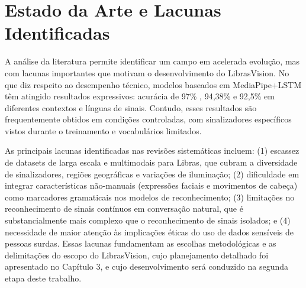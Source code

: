 \section{Estado da Arte e Lacunas Identificadas}

A análise da literatura permite identificar um campo em acelerada evolução, mas com lacunas importantes que motivam o desenvolvimento do LibrasVision. No que diz respeito ao desempenho técnico, modelos baseados em MediaPipe+LSTM têm atingido resultados expressivos: acurácia de 97\% \cite{anithadevi:25}, 94,38\% \cite{varshini:25} e 92,5\% \cite{costa-i3d:25} em diferentes contextos e línguas de sinais. Contudo, esses resultados são frequentemente obtidos em condições controladas, com sinalizadores específicos vistos durante o treinamento e vocabulários limitados.

As principais lacunas identificadas nas revisões sistemáticas \cite{costa-slr:25,silva-ia:25,silva-libras:25} incluem: (1) escassez de datasets de larga escala e multimodais para Libras, que cubram a diversidade de sinalizadores, regiões geográficas e variações de iluminação; (2) dificuldade em integrar características não-manuais (expressões faciais e movimentos de cabeça) como marcadores gramaticais nos modelos de reconhecimento; (3) limitações no reconhecimento de sinais contínuos em conversação natural, que é substancialmente mais complexo que o reconhecimento de sinais isolados; e (4) necessidade de maior atenção às implicações éticas do uso de dados sensíveis de pessoas surdas. Essas lacunas fundamentam as escolhas metodológicas e as delimitações do escopo do LibrasVision, cujo planejamento detalhado foi apresentado no Capítulo 3, e cujo desenvolvimento será conduzido na segunda etapa deste trabalho.

